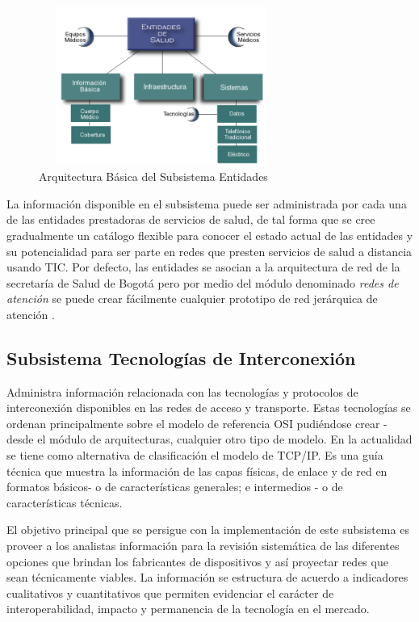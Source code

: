 \begin{figure}
 \centering
 \includegraphics[width=80mm, height=52mm]{entidades.png}
 \caption{Arquitectura Básica del Subsistema Entidades}
\label{entidades}
\end{figure}

La información disponible en el subsistema puede ser administrada por cada una de las entidades prestadoras de servicios de salud, de tal forma que se cree gradualmente un catálogo flexible para conocer el estado actual de las entidades y su potencialidad para ser parte en redes que presten servicios de salud a distancia usando TIC. Por defecto, las entidades se asocian a la arquitectura de red de la secretaría de Salud de Bogotá pero por medio del módulo denominado \textit{redes de atención} se puede crear fácilmente cualquier prototipo de red jerárquica de atención \cite{yellowlees}.

\subsection{Subsistema Tecnologías de Interconexión} 
Administra información relacionada con las tecnologías y protocolos de interconexión disponibles en las redes de acceso y transporte. Estas tecnologías se ordenan principalmente sobre el modelo de referencia OSI pudiéndose crear  - desde el módulo de arquitecturas, cualquier otro tipo de modelo. En la actualidad se tiene como alternativa de clasificación el modelo de TCP/IP. Es una guía técnica que muestra la información de las capas físicas, de enlace y de red en formatos básicos- o de características generales; e intermedios - o de características técnicas.

El objetivo principal que se persigue con la implementación de este subsistema es proveer a los analistas información para la revisión sistemática de las diferentes opciones que brindan los fabricantes de dispositivos y así proyectar redes que sean técnicamente viables. La información se estructura de acuerdo a indicadores cualitativos y cuantitativos que permiten evidenciar el carácter de interoperabilidad, impacto y permanencia de la tecnología en el mercado. 

